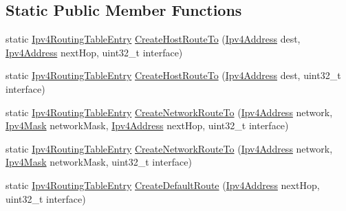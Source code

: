 \subsection*{Static Public Member Functions}
\begin{DoxyCompactItemize}
\item 
static \hyperlink{classns3_1_1Ipv4RoutingTableEntry}{Ipv4\+Routing\+Table\+Entry} \hyperlink{classns3_1_1Ipv4RoutingTableEntry_ac19037fbc291dfb873a5a7792d3329be}{Create\+Host\+Route\+To} (\hyperlink{classns3_1_1Ipv4Address}{Ipv4\+Address} dest, \hyperlink{classns3_1_1Ipv4Address}{Ipv4\+Address} next\+Hop, uint32\+\_\+t interface)
\item 
static \hyperlink{classns3_1_1Ipv4RoutingTableEntry}{Ipv4\+Routing\+Table\+Entry} \hyperlink{classns3_1_1Ipv4RoutingTableEntry_aec7c1a23b0c22dd161a6a1ed073d0cf0}{Create\+Host\+Route\+To} (\hyperlink{classns3_1_1Ipv4Address}{Ipv4\+Address} dest, uint32\+\_\+t interface)
\item 
static \hyperlink{classns3_1_1Ipv4RoutingTableEntry}{Ipv4\+Routing\+Table\+Entry} \hyperlink{classns3_1_1Ipv4RoutingTableEntry_abe3447a00495ded05ab095673531947a}{Create\+Network\+Route\+To} (\hyperlink{classns3_1_1Ipv4Address}{Ipv4\+Address} network, \hyperlink{classns3_1_1Ipv4Mask}{Ipv4\+Mask} network\+Mask, \hyperlink{classns3_1_1Ipv4Address}{Ipv4\+Address} next\+Hop, uint32\+\_\+t interface)
\item 
static \hyperlink{classns3_1_1Ipv4RoutingTableEntry}{Ipv4\+Routing\+Table\+Entry} \hyperlink{classns3_1_1Ipv4RoutingTableEntry_a8828c66130a390688dde3658f0d1665c}{Create\+Network\+Route\+To} (\hyperlink{classns3_1_1Ipv4Address}{Ipv4\+Address} network, \hyperlink{classns3_1_1Ipv4Mask}{Ipv4\+Mask} network\+Mask, uint32\+\_\+t interface)
\item 
static \hyperlink{classns3_1_1Ipv4RoutingTableEntry}{Ipv4\+Routing\+Table\+Entry} \hyperlink{classns3_1_1Ipv4RoutingTableEntry_a2257bd8b5391e59d624a43e65b48c081}{Create\+Default\+Route} (\hyperlink{classns3_1_1Ipv4Address}{Ipv4\+Address} next\+Hop, uint32\+\_\+t interface)
\end{DoxyCompactItemize}
